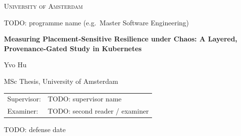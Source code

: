 \documentclass[11pt,a4paper]{report}
\newcommand{\thesistitle}{Measuring Placement-Sensitive Resilience under Chaos: A Layered, Provenance-Gated Study in Kubernetes}
\newcommand{\thesisauthor}{Yvo Hu}
\newcommand{\thesisdegree}{MSc Thesis, University of Amsterdam}
\newcommand{\thesissupervisor}{TODO: supervisor name}
\newcommand{\thesisexaminer}{TODO: second reader / examiner}
\newcommand{\thesisdate}{TODO: defense date}
\newcommand{\thesisprogramme}{TODO: programme name (e.g.\ Master Software Engineering)}
\begin{document}
\begin{titlepage}
  \centering
  {\scshape\large University of Amsterdam\par}
  {\large \thesisprogramme\par}
  \vspace{3cm}
  {\huge\bfseries \thesistitle\par}
  \vspace{1.5cm}
  {\Large \thesisauthor\par}
  \vspace{0.5cm}
  {\large \thesisdegree\par}
  \vfill
  \begin{tabular}{ll}
    Supervisor: & \thesissupervisor \\
    Examiner:   & \thesisexaminer   \\
  \end{tabular}
  \vspace{1cm}
  {\par\large \thesisdate\par}
\end{titlepage}
\end{document}
